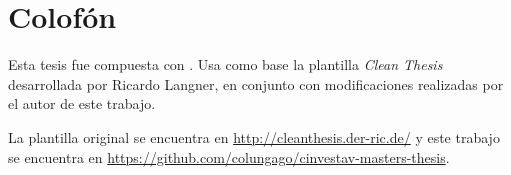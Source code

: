 %
\pagestyle{empty}
\hfill
\vfill
{}
\section*{Colofón}

Esta tesis fue compuesta con \LaTeXe.
Usa como base la plantilla \textit{Clean Thesis} desarrollada por Ricardo Langner, en conjunto con modificaciones realizadas por el autor de este trabajo.

La plantilla original se encuentra en \url{http://cleanthesis.der-ric.de/} y este trabajo se encuentra en \url{https://github.com/colungago/cinvestav-masters-thesis}.
